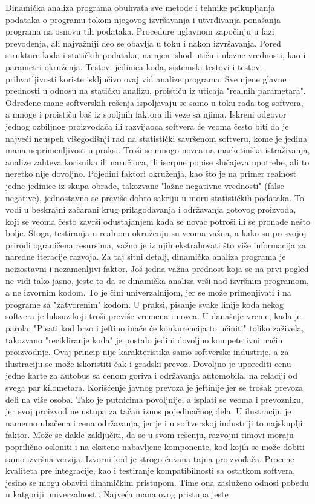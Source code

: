 \documentclass[12pt,oneside]{memoir}
\begin{document}
Dinamička analiza \cite{Gupta} programa obuhvata sve metode i tehnike prikupljanja podataka o programu tokom njegovog izvršavanja i utvrđivanja ponašanja programa na osnovu tih podataka. Procedure uglavnom započinju u fazi prevođenja, ali najvažniji deo se obavlja u toku i nakon izvršavanja. Pored strukture koda i statičkih podataka, na njen ishod utiču i ulazne vrednosti, kao i parametri okruženja. Testovi jedinica koda, sistemski testovi i testovi prihvatljivosti koriste isključivo ovaj vid analize programa. Sve njene glavne prednosti u odnosu na statičku analizu, proističu iz uticaja "realnih parametara". Određene mane softverskih rešenja ispoljavaju se samo u toku rada tog softvera, a mnoge i proističu baš iz spoljnih faktora ili veze sa njima. Iskreni odgovor jednog ozbiljnog proizvođača ili razvijaoca softvera će veoma često biti da je najveći neuspeh višegodišnji rad na statistički savršenom softveru, kome je jedina mana neprimenljivost u praksi. Troši se mnogo novca na marketinška istraživanja, analize zahteva korisnika ili naručioca, ili iscrpne popise slučajeva upotrebe, ali to neretko nije dovoljno. Pojedini faktori okruženja, kao što je na primer realnost jedne jedinice iz skupa obrade, takozvane "lažne negativne vrednosti" (false negative), jednostavno se previše dobro sakriju u moru statističkih podataka. To vodi u beskrajni začarani krug prilagođavanja i održavanja gotovog proizvoda, koji se veoma često završi odustajanjem kada se novac potroši ili se pronađe nešto bolje. Stoga, testiranja u realnom okruženju su veoma važna, a kako su po svojoj prirodi ograničena resursima, važno je iz njih ekstrahovati što više informacija za naredne iteracije razvoja. Za taj sitni detalj, dinamička analiza programa je neizostavni i nezamenljivi faktor. Još jedna važna prednost koja se na prvi pogled ne vidi tako jasno, jeste to da se dinamička analiza vrši nad izvršnim programom, a ne izvornim kodom. To je čini univerzalnijom, jer se može primenjivati i na programe sa "zatvorenim" kodom. U praksi, pisanje svake linije koda nekog softvera je luksuz koji troši previše vremena i novca. U današnje vreme, kada je parola: "Pisati kod brzo i jeftino inače će konkurencija to učiniti" toliko zaživela, takozvano "recikliranje koda" je postalo jedini dovoljno kompetetivni način proizvodnje. Ovaj princip nije karakteristika samo softverske industrije, a za ilustraciju se može iskoristiti čak i gradski prevoz. Dovoljno je uporediti cenu jedne karte za autobus sa cenom goriva i održavanja automobila, na relaciji od svega par kilometara. Korišćenje javnog prevoza je jeftinije jer se trošak prevoza deli na više osoba. Tako je putnicima povoljnije, a isplati se veoma i prevozniku, jer svoj proizvod ne ustupa za tačan iznos pojedinačnog dela. U ilustraciju je namerno ubačena i cena održavanja, jer je i u softverskoj industriji to najskuplji faktor. Može se dakle zaključiti, da se u svom rešenju, razvojni timovi moraju poprilično osloniti i na eksteno nabavljene komponente, kod kojih se može dobiti samo izvršna verzija. Izvorni kod je strogo čuvana tajna proizvođača. Procene kvaliteta pre integracije, kao i testiranje kompatibilnosti sa ostatkom softvera, jesino se mogu obaviti dinamičkim pristupom. Time ona zasluženo odnosi pobedu u katgoriji univerzalnosti. Najveća mana ovog pristupa jeste 
\end{document}
